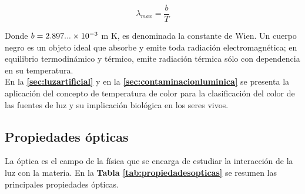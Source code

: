 \begin{equation}
\lambda_{max} = \dfrac{b}{T}
\end{equation}

Donde $b = 2.897...\times 10^{-3}$ m K, es denominada la constante de Wien. Un cuerpo negro es un objeto ideal que absorbe y emite toda radiación electromagnética; en equilibrio termodinámico y térmico, emite radiación térmica sólo con dependencia en su temperatura.\\

En la \textbf{\autoref{sec:luzartificial}} y en la \textbf{\autoref{sec:contaminacionluminica}} se presenta la aplicación del concepto de temperatura de color para la clasificación del color de las fuentes de luz y su implicación biológica en los seres vivos.\\

\subsection{Propiedades ópticas}

La óptica es el campo de la física que se encarga de estudiar la interacción de la luz con la materia. En la  \textbf{Tabla \ref{tab:propiedadesopticas}} se resumen las principales propiedades ópticas.


